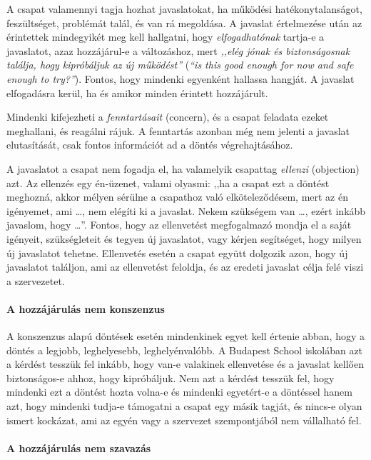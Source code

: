 A csapat valamennyi tagja hozhat javaslatokat, ha működési
hatékonytalanságot, feszültséget, problémát talál, és van rá
megoldása. A javaslat értelmezése után az érintettek mindegyikét meg
kell hallgatni, hogy \emph{elfogadhatónak} tartja-e a javaslatot, azaz
hozzájárul-e a változáshoz, mert \emph{,,elég jónak és biztonságosnak
  találja, hogy kipróbáljuk az új működést''} (\emph{``is this
  good enough for now and safe enough to try?''}). Fontos, hogy
mindenki egyenként hallassa hangját. A javaslat elfogadásra kerül, ha
és amikor minden érintett hozzájárult.

Mindenki kifejezheti a \emph{fenntartásait} (concern), és a csapat feladata ezeket meghallani, és reagálni rájuk. A fenntartás azonban még nem jelenti a javaslat elutasítását, csak fontos információt ad a döntés végrehajtásához.

A javaslatot a csapat nem fogadja el, ha valamelyik csapattag \emph{ellenzi} (objection) azt. Az ellenzés egy én-üzenet, valami olyasmi: ,,ha a csapat ezt a döntést meghozná, akkor mélyen sérülne a csapathoz való elköteleződésem, mert az én igényemet, ami \ldots{}, nem elégíti ki a javaslat. Nekem szükségem van \ldots{}, ezért inkább javaslom, hogy \ldots{}''. Fontos, hogy az ellenvetést megfogalmazó mondja el a saját igényeit, szükségleteit és tegyen új javaslatot, vagy kérjen segítséget, hogy milyen új javaslatot tehetne. Ellenvetés esetén a csapat együtt dolgozik azon, hogy új javaslatot találjon, ami az ellenvetést feloldja, és az eredeti javaslat célja felé viszi a szervezetet.

\paragraph{A hozzájárulás nem konszenzus}

A konszenzus alapú döntések esetén mindenkinek egyet kell értenie abban, hogy a döntés a legjobb, leghelyesebb, leghelyénvalóbb. A Budapest School iskolában azt a kérdést tesszük fel inkább, hogy van-e valakinek ellenvetése és a javaslat kellően biz\-ton\-sá\-gos-e ahhoz, hogy kipróbáljuk. Nem azt a kérdést tesszük fel, hogy mindenki ezt a döntést hozta volna-e és mindenki egyetért-e a döntéssel hanem azt, hogy mindenki tudja-e támogatni a csapat egy másik tagját, és nincs-e olyan ismert kockázat, ami az egyén vagy a szervezet szempontjából nem vállalható fel.

\paragraph{A hozzájárulás nem szavazás}

